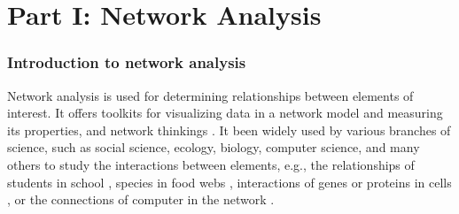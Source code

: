 \section*{Part I: Network Analysis}
\label{ch:partone}

\subsubsection{Introduction to network analysis}
Network analysis is used for determining relationships between elements of interest. It offers toolkits for visualizing data in a network model and measuring its properties, and network thinkings . It been widely used by various branches of science, such as social science, ecology, biology, computer science, and many others to study the interactions between elements, e.g., the relationships of students in school , species in food webs , interactions of genes or proteins in cells , or the connections of computer in the network .

